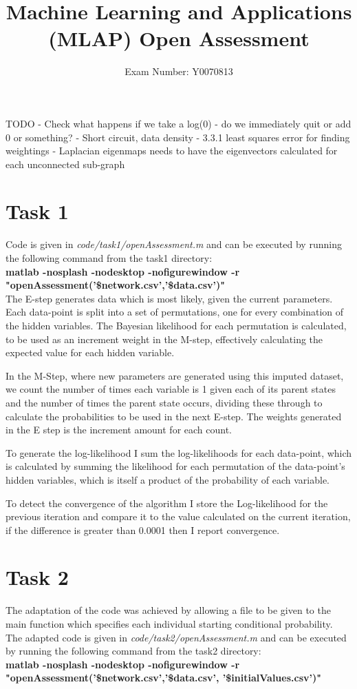 \documentclass{article}
\begin{document}
\title{Machine Learning and Applications (MLAP) Open Assessment}
\author{Exam Number: Y0070813}
\date{\vspace{-5ex}}
\maketitle
TODO - Check what happens if we take a log(0) - do we immediately quit or add 0 or something?
- Short circuit, data density	
 - 3.3.1 least squares error for finding weightings
- Laplacian eigenmaps needs to have the eigenvectors calculated for each unconnected sub-graph
\section{Task 1}
Code is given in \textit{code/task1/openAssessment.m} and can be executed by running the following command from the task1 directory: \\
\textbf{matlab -nosplash -nodesktop -nofigurewindow -r "openAssessment('\$network.csv','\$data.csv')"}\\


The E-step generates data which is most likely, given the current parameters. Each data-point is split into a set of permutations, one for every combination of the hidden variables. The Bayesian likelihood for each permutation is calculated, to be used as an increment weight in the M-step, effectively calculating the expected value for each hidden variable.

In the M-Step, where new parameters are generated using this imputed dataset, we count the number of times each variable is 1 given each of its parent states and the number of times the parent state occurs, dividing these through to calculate the probabilities to be used in the next E-step. The weights generated in the E step is the increment amount for each count. 

To generate the log-likelihood I sum the log-likelihoods for each data-point, which is calculated by summing the likelihood for each permutation of the data-point's hidden variables, which is itself a product of the probability of each variable.

To detect the convergence of the algorithm I store the Log-likelihood for the previous iteration and compare it to the value calculated on the current iteration, if the difference is greater than 0.0001 then I report convergence.
\section{Task 2}
The adaptation of the code was achieved by allowing a file to be given to the main function which specifies each individual starting conditional probability. The adapted code is given in \textit{code/task2/openAssessment.m} and can be executed by running the following command from the task2 directory:\\
\textbf{matlab -nosplash -nodesktop -nofigurewindow -r "openAssessment('\$network.csv','\$data.csv', '\$initialValues.csv')"} \\\\
\end{document}
